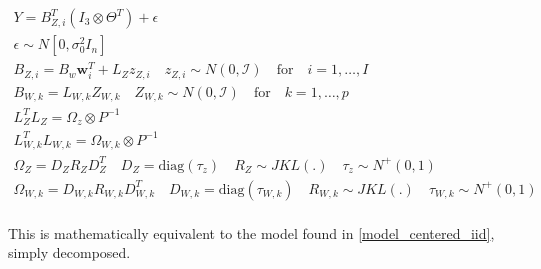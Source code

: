 \begin{equation}
    \begin{split}
    Y = B_{Z,i}^T\left(I_3 \otimes\Theta^T\right) + \epsilon\\
    \epsilon\sim N[0, \sigma_{0}^2 I_n]\\
    B_{Z,i} = B_w\boldsymbol{w}_i^T + L_{Z}z_{Z,i}\quad z_{Z,i} \sim N\left(0,\mathcal{I} \right)\quad\text{for} \quad i = 1,\dots, I\\
    B_{W,k} = L_{W,k}Z_{W,k}\quad Z_{W,k}\sim N\left(0,\mathcal{I}\right)\quad \text{for} \quad k = 1,\dots, p\\
    L_Z^TL_Z = \Omega_z\otimes P^{-1}\\
    L_{W,k}^TL_{W,k} = \Omega_{W,k}\otimes P^{-1}\\
    \Omega_{Z} = D_ZR_ZD_Z^T\quad D_Z = \text{diag}(\tau_z)\quad R_Z \sim JKL(.)\quad \tau_z\sim N^{+}(0,1)\\
    \Omega_{W,k} = D_{W,k}R_{W,k}D_{W,k}^T\quad D_{W,k} = \text{diag}(\tau_{W,k})\quad R_{W,k}\sim JKL(.)\quad \tau_{W,k}\sim N^{+}(0,1)\\
    \end{split}
    \label{model:uncentered}
\end{equation}

This is mathematically equivalent to the model found in \eqref{model_centered_iid}, simply decomposed.